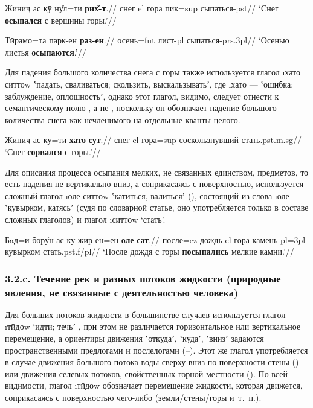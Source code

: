 \begingl
\gla Жиниҷ ас кӯ ну̊л=ти \textbf{рих̌-т}.//
\glc снег {\sc el} гора пик={\sc sup} сыпаться-{\sc pst}//
\glft ‘Снег \textbf{осыпался} с вершины горы.’//
\endgl \xe

\begingl
\gla Тӣрамо=та парк-ен \textbf{раз-ен}.//
\glc осень={\sc fut} лист-{\sc pl} сыпаться-{\sc prs.3pl}//
\glft ‘Осенью листья \textbf{осыпаются}.’//
\endgl \xe

Для падения большого количества снега с горы также используется глагол \i{хато ситтоw} ʽпадать, сваливаться; скользить, выскальзыватьʼ, где \i{хато} — ʽошибка; заблуждение, оплошностьʼ, однако этот глагол, видимо, следует отнести к семантическому полю , а не , поскольку он обозначает падение большого количества снега как нечленимого на отдельные кванты целого.

\begingl
\gla Жиниҷ ас кӯ=ти \textbf{хато} \textbf{сут}.//
\glc снег {\sc el} гора={\sc sup} соскользнувший стать.{\sc pst.m.sg}//
\glft ‘Снег \textbf{сорвался} с горы.’//
\endgl \xe

Для описания процесса осыпания мелких, не связанных единством, предметов, то есть падения не вертикально вниз, а соприкасаясь с поверхностью, используется сложный глагол \i{оле ситтоw} ʽкатиться, валитьсяʼ (), состоящий из слова \i{оле} ʽкувырком, катясьʼ (судя по словарной статье, оно употребляется только в составе сложных глаголов) и глагол \i{ситтоw} ‘стать’.

\begingl
\gla Бāд=и бору̊н ас кӯ жӣр-ен=ен \textbf{оле} \textbf{сат}.//
\glc после={\sc ez} дождь {\sc el} гора камень-{\sc pl=3pl} кувырком стать.{\sc pst.f/pl}//
\glft ‘После дождя с горы \textbf{посыпались} мелкие камни.’//
\endgl \xe

\subsubsection{3.2.c. Течение рек и разных потоков жидкости (природные явления, не связанные с деятельностью человека)} \label{pour-32c}

Для больших потоков жидкости в большинстве случаев используется глагол \i{тӣдоw} ‘идти; течьʼ \parencite[71–72]{karamshoev1999}, при этом не различается горизонтальное или вертикальное перемещение, а ориентиры движения ʽоткудаʼ, ʽкудаʼ, ʽвнизʼ задаются пространственными предлогами и послелогами (–). Этот же глагол употребляется в случае движения большого потока воды сверху вниз по поверхности стены () или движения селевых потоков, свойственных горной местности (). По всей видимости, глагол \i{тӣдоw} обозначает перемещение жидкости, которая движется, соприкасаясь с поверхностью чего-либо (земли/стены/горы и~т.~п.).

